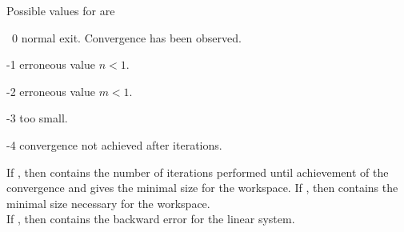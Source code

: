 Possible values for  are 
\begin{listparam}
  \item[~0] normal exit. Convergence has been observed.
  \item[-1] erroneous value $n < 1$.
  \item[-2] erroneous value $m < 1$.
  \item[-3]  too small.
  \item[-4] convergence not achieved after  iterations.
\end{listparam}  

If , then  contains the number of
iterations performed until achievement of the convergence and
 gives the minimal size for the workspace.
If , then  contains the minimal size
necessary for the workspace. \\

If , then  contains the backward error
for the linear system.
%
